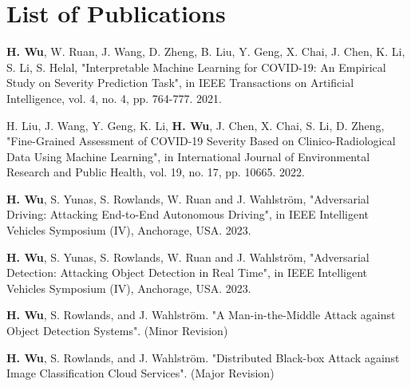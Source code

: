 \chapter*{List of Publications}

\noindent \textbf{H. Wu}, W. Ruan, J. Wang, D. Zheng, B. Liu, Y. Geng, X. Chai, J. Chen, K. Li, S. Li, S. Helal, "Interpretable Machine Learning for COVID-19: An Empirical Study on Severity Prediction Task", in IEEE Transactions on Artificial Intelligence, vol. 4, no. 4, pp. 764-777. 2021.

\vspace{4pt}

\noindent
H. Liu, J. Wang, Y. Geng, K. Li, \textbf{H. Wu}, J. Chen, X. Chai, S. Li, D. Zheng, "Fine-Grained Assessment of COVID-19 Severity Based on Clinico-Radiological Data Using Machine Learning", in International Journal of Environmental Research and Public Health, vol. 19, no. 17, pp. 10665. 2022.

\vspace{4pt}

\noindent
\textbf{H. Wu}, S. Yunas, S. Rowlands, W. Ruan and J. Wahlström, "Adversarial Driving: Attacking End-to-End Autonomous Driving", in IEEE Intelligent Vehicles Symposium (IV), Anchorage, USA. 2023.

\vspace{4pt}

\noindent
\textbf{H. Wu}, S. Yunas, S. Rowlands, W. Ruan and J. Wahlström, "Adversarial Detection: Attacking Object Detection in Real Time", in IEEE Intelligent Vehicles Symposium (IV), Anchorage, USA. 2023.

\vspace{4pt}

\noindent
\textbf{H. Wu}, S. Rowlands, and J. Wahlström. "A Man-in-the-Middle Attack against Object Detection Systems". (Minor Revision)

\vspace{4pt}

\noindent
\textbf{H. Wu}, S. Rowlands, and J. Wahlström. "Distributed Black-box Attack against Image Classification Cloud Services". (Major Revision)


